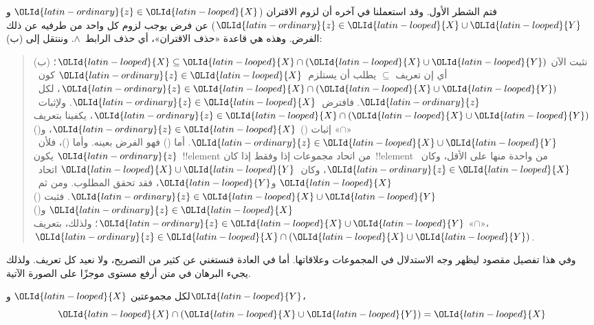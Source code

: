 \documentclass[../../../include/open-logic-section]{subfiles}
\begin{document}
\begin{explain}
فتم الشطر الأول. وقد استعملنا في آخره أن لزوم الاقتران
($\OLId{latin-ordinary}{z} \in \OLId{latin-looped}{X}$ و$\OLId{latin-ordinary}{z} \in \OLId{latin-looped}{X} \cup \OLId{latin-looped}{Y}$) عن فرض يوجب لزوم كل واحد من طرفيه عن
ذلك الفرض. وهذه هي قاعدة «حذف الاقتران»، أي حذف الرابط~$\land$. وننتقل
إلى (ب):

\begin{quote}
(ب) نثبت الآن $\OLId{latin-looped}{X} \subseteq \OLId{latin-looped}{X} \cap (\OLId{latin-looped}{X} \cup \OLId{latin-looped}{Y})$؛ أي إن تعريف
$\subseteq$ يطلب أن يستلزم~$\OLId{latin-ordinary}{z} \in \OLId{latin-looped}{X}$ كون~$\OLId{latin-ordinary}{z} \in \OLId{latin-looped}{X} \cap
(\OLId{latin-looped}{X} \cup \OLId{latin-looped}{Y})$، لكل~$\OLId{latin-ordinary}{z}$. فافترض~$\OLId{latin-ordinary}{z} \in \OLId{latin-looped}{X}$. ولإثبات~$\OLId{latin-ordinary}{z} \in \OLId{latin-looped}{X}
\cap (\OLId{latin-looped}{X} \cup \OLId{latin-looped}{Y})$، يكفينا بتعريف «$\cap$» إثبات ()
$\OLId{latin-ordinary}{z} \in \OLId{latin-looped}{X}$، و() $\OLId{latin-ordinary}{z} \in \OLId{latin-looped}{X} \cup \OLId{latin-looped}{Y}$. أما () فهو الفرض بعينه. وأما ()،
فلأن~$\OLId{latin-ordinary}{z}$ يكون~!!{element} من اتحاد مجموعات إذا وفقط إذا كان~!!{element}
من واحدة منها على الأقل، وكان~$\OLId{latin-ordinary}{z} \in \OLId{latin-looped}{X}$، وكان~$\OLId{latin-looped}{X} \cup \OLId{latin-looped}{Y}$ اتحاد~$\OLId{latin-looped}{X}$
و$\OLId{latin-looped}{Y}$، فقد تحقق المطلوب. ومن ثم~$\OLId{latin-ordinary}{z} \in \OLId{latin-looped}{X} \cup \OLId{latin-looped}{Y}$. فثبت ()
$\OLId{latin-ordinary}{z} \in \OLId{latin-looped}{X}$ و() $\OLId{latin-ordinary}{z} \in \OLId{latin-looped}{X} \cup \OLId{latin-looped}{Y}$؛ ولذلك، بتعريف «$\cap$»،
$\OLId{latin-ordinary}{z} \in \OLId{latin-looped}{X} \cap (\OLId{latin-looped}{X} \cup \OLId{latin-looped}{Y})$.
\end{quote}

وفي هذا تفصيل مقصود ليظهر وجه الاستدلال في المجموعات وعلاقاتها. أما في
العادة فنستغني عن كثير من التصريح، ولا نعيد كل تعريف. ولذلك يجيء البرهان
في متن أرفع مستوى موجزًا على الصورة الآتية.
\end{explain}


\begin{prop}[الامتصاص]
لكل مجموعتين $\OLId{latin-looped}{X}$ و$\OLId{latin-looped}{Y}$،
\[
\OLId{latin-looped}{X} \cap (\OLId{latin-looped}{X} \cup \OLId{latin-looped}{Y}) = \OLId{latin-looped}{X}
\]
\end{prop}
\end{document}
